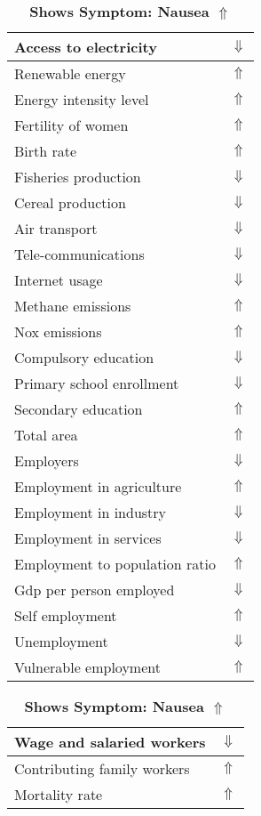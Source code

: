 \documentclass[12pt,notitlepage,oneside]{report}
\begin{document}
\begin{table}[!htb]
\caption{\textbf{Shows Symptom: Nausea $\Uparrow$}}
\centering
\label{Correlated Socio-economic Factors0}
\begin{tabular}{|l|l|}
\hline
Access to electricity & $\Downarrow$\\ \hline
Renewable energy & $\Uparrow$\\ \hline
Energy intensity level & $\Uparrow$\\ \hline
Fertility of women & $\Uparrow$\\ \hline
Birth rate & $\Uparrow$\\ \hline
Fisheries production & $\Downarrow$\\ \hline
Cereal production & $\Downarrow$\\ \hline
Air transport  & $\Downarrow$\\ \hline
Tele-communications & $\Downarrow$\\ \hline
Internet usage & $\Downarrow$\\ \hline
Methane emissions & $\Uparrow$\\ \hline
Nox emissions & $\Uparrow$\\ \hline
Compulsory education & $\Downarrow$\\ \hline
Primary school enrollment & $\Downarrow$\\ \hline
Secondary education & $\Uparrow$\\ \hline
Total area & $\Uparrow$\\ \hline
Employers & $\Downarrow$\\ \hline
Employment in agriculture & $\Uparrow$\\ \hline
Employment in industry & $\Downarrow$\\ \hline
Employment in services & $\Downarrow$\\ \hline
Employment to population ratio & $\Uparrow$\\ \hline
Gdp per person employed & $\Downarrow$\\ \hline
Self employment & $\Uparrow$\\ \hline
Unemployment & $\Downarrow$\\ \hline
Vulnerable employment & $\Uparrow$\\ \hline
\end{tabular}
\begin{tabular}{|l|l|}
\hline
Wage and salaried workers & $\Downarrow$\\ \hline
Contributing family workers & $\Uparrow$\\ \hline
Mortality rate & $\Uparrow$\\ \hline

\end{tabular}
\end{table}
\end{document}
